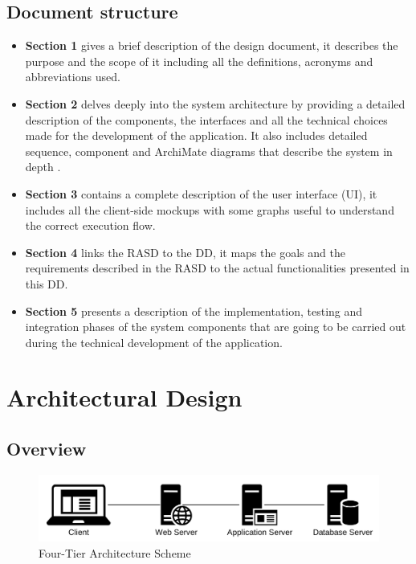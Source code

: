 \documentclass[table, 12pt]{article}
\begin{document}
\subsection{Document structure}
\begin{itemize}
    \item \textbf{Section 1} gives a brief description of the design document, it describes the purpose and the scope of it including all the definitions, acronyms and abbreviations used. 
    \item \textbf{Section 2} delves deeply into the system architecture by providing a detailed description of the components, the interfaces and all the technical choices made for the development of the application.
    It also includes detailed sequence, component and ArchiMate diagrams that describe the system in depth .
    \item \textbf{Section 3} contains a complete description of the user interface (UI), it includes all the client-side mockups with some graphs useful to understand the correct execution flow.
    \item \textbf{Section 4} links the RASD to the DD, it maps the goals and the requirements described in the RASD to the actual functionalities presented in this DD.
    \item \textbf{Section 5} presents a description of the implementation, testing and integration phases of the system components that are going to be carried out during the technical development of the application.
\end{itemize}

\newpage
\section{Architectural Design}

\subsection{Overview}
\begin{center}
    \begin{figure}[H]
        \includegraphics[scale=0.55, center]{assets/4-tier-scheme.jpg}
        \caption{Four-Tier Architecture Scheme}
        \label{fig: four-tier-architecture-scheme}
    \end{figure}
\end{center}
\end{document}
